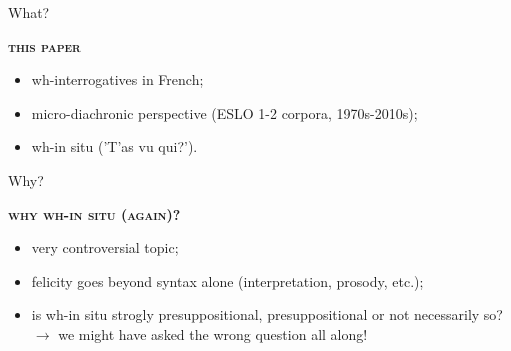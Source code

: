 \documentclass[lesson_slides]{subfiles}
\begin{document}
\begin{frame}[c]{What?}

    \textbf{\textsc{this paper}} \pause
    \begin{itemize}
        \item[\ding{227}] wh-interrogatives in French; \pause
        \item[\ding{227}] micro-diachronic perspective \pause (ESLO 1-2 corpora, 1970s-2010s);\\ \pause
        \item[\ding{227}] wh-in situ \pause ('T'as vu qui?').
    \end{itemize}
    
\end{frame}
\begin{frame}[c]{Why?}

    \textbf{\textsc{why wh-in situ (again)?}} \pause
    \begin{itemize}
        \item[\ding{227}] very controversial topic; \pause
        \item[\ding{227}] felicity goes beyond syntax alone (interpretation, prosody, etc.); \pause
        \item[\ding{227}] is wh-in situ strogly presuppositional, presuppositional or not necessarily so?\\ \pause 
        $\longrightarrow$ we might have asked the wrong question all along!
    \end{itemize}
  
\end{frame}
\end{document}
